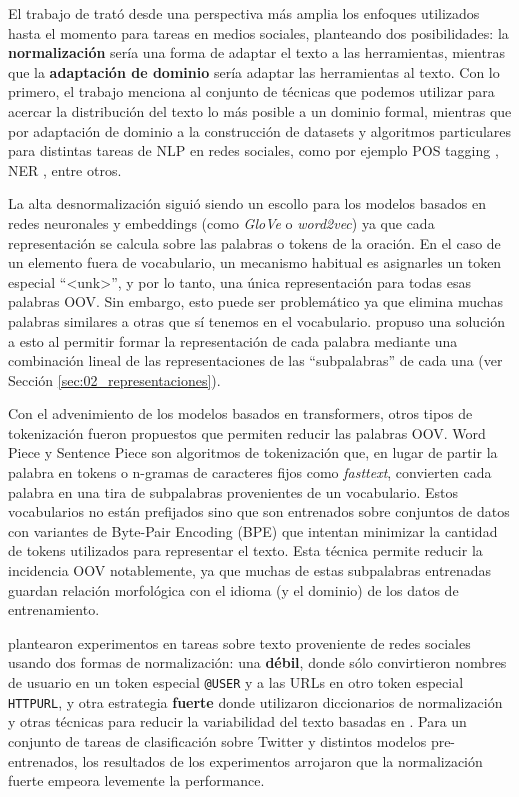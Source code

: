 El trabajo de \citet{eisenstein2013bad} trató desde una perspectiva más amplia los enfoques utilizados hasta el momento para tareas en medios sociales, planteando dos posibilidades: la \textbf{normalización} sería una forma de adaptar el texto a las herramientas, mientras que la \textbf{adaptación de dominio} sería adaptar las herramientas al texto. Con lo primero, el trabajo menciona al conjunto de técnicas que podemos utilizar para acercar la distribución del texto lo más posible a un dominio formal, mientras que por adaptación de dominio a la construcción de datasets y algoritmos particulares para distintas tareas de NLP en redes sociales, como por ejemplo POS tagging \cite{gimpel2010part}, NER \cite{ritter2011named}, entre otros.


La alta desnormalización siguió siendo un escollo para los modelos basados en redes neuronales y embeddings (como \emph{GloVe} o \emph{word2vec}) ya que cada representación se calcula sobre las palabras o tokens de la oración. En el caso de un elemento fuera de vocabulario, un mecanismo habitual es asignarles un token especial ``<unk>'', y por lo tanto, una única representación para todas esas palabras OOV. Sin embargo, esto puede ser problemático ya que elimina muchas palabras similares a otras que sí tenemos en el vocabulario. \citet{bojanowski16} propuso una solución a esto al permitir formar la representación de cada palabra mediante una combinación lineal de las representaciones de las ``subpalabras'' de cada una (ver Sección \ref{sec:02_representaciones}).

Con el advenimiento de los modelos basados en transformers, otros tipos de tokenización fueron propuestos que permiten reducir las palabras OOV. Word Piece \cite{schuster2012japanese} y Sentence Piece \cite{kudo-richardson-2018-sentencepiece} son algoritmos de tokenización que, en lugar de partir la palabra en tokens o n-gramas de caracteres fijos como \emph{fasttext}, convierten cada palabra en una tira de subpalabras provenientes de un vocabulario. Estos vocabularios no están prefijados sino que son entrenados sobre conjuntos de datos con variantes de Byte-Pair Encoding (BPE) \cite{sennrich2016neural} que intentan minimizar la cantidad de tokens utilizados para representar el texto. Esta técnica permite reducir la incidencia OOV notablemente, ya que muchas de estas subpalabras entrenadas guardan relación morfológica con el idioma (y el dominio) de los datos de entrenamiento.

\citet{dat2020bertweet} plantearon experimentos en tareas sobre texto proveniente de redes sociales usando dos formas de normalización: una \textbf{débil}, donde sólo convirtieron nombres de usuario en un token especial \verb|@USER| y a las URLs en otro token especial \verb|HTTPURL|, y otra estrategia \textbf{fuerte} donde utilizaron diccionarios de normalización y otras técnicas para reducir la variabilidad del texto basadas en \citet{han2011lexical}. Para un conjunto de tareas de clasificación sobre Twitter y distintos modelos pre-entrenados, los resultados de los experimentos arrojaron que la normalización fuerte empeora levemente la performance.

